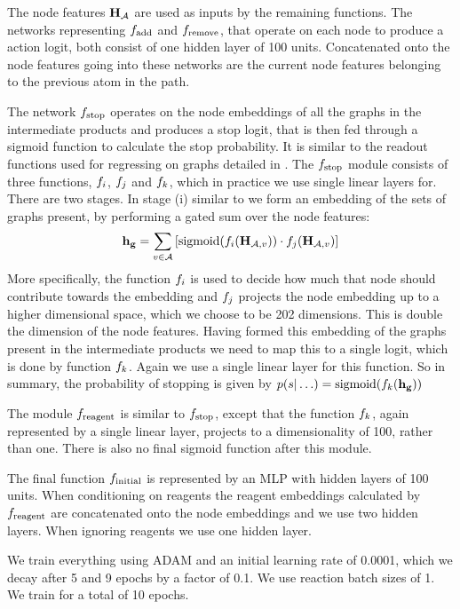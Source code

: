 \documentclass{article}
\begin{document}
The node features ${\mathbf{H}}_{{\mathcal{A}}}$ are used as inputs by the remaining functions. 
The networks representing $f_{\textrm{add}}$ and $f_{\textrm{remove}}$, that operate on each node to produce a action logit, both consist of one hidden layer of 100 units. 
Concatenated onto the node features going into these networks are the current node features belonging to the previous atom in the path.

The network $f_{\textrm{stop}}$ operates on the node embeddings of all the graphs in the intermediate products and produces a stop logit, that is then fed through a sigmoid function to calculate the stop probability.
 It is similar to the readout functions used for regressing on graphs detailed in \citep[Eq. 3]{gilmer2017neural}. 
The $f_{\textrm{stop}}$ module consists of three functions, $f_i$, $f_j$ and $f_k$, which in practice we use single linear layers for. There are two stages. 
In stage (i) similar to \citet[\S B.1]{li2018learning} we form an embedding of the sets of graphs present, by performing a gated sum over the node features:
\begin{align*}
	\mathbf{h_g} = \sum_{v \in {\mathcal{A}}} \left[ \mbox{sigmoid}(f_i({\mathbf{H}}_{{\mathcal{A}},v})) \cdot f_j({\mathbf{H}}_{{\mathcal{A}},v}) \right]
\end{align*}
More specifically, the function $f_i$ is used to decide how much that node should contribute towards the embedding and $f_j$ projects the node embedding up to a higher dimensional space, which we choose to be 202 dimensions. This is double the dimension of the node features.
Having formed this embedding of the graphs present in the intermediate products we need to map this to a single logit, which is done by function $f_k$. 
Again we use a single linear layer for this function.
 So in summary, the probability of stopping is given by $p(s| \ldots) = \mbox{sigmoid} (f_k(\mathbf{h_g}))$

The module $f_{\textrm{reagent}}$ is similar to $f_{\textrm{stop}}$, except that the function $f_k$, again represented by a single linear layer, projects  to a dimensionality of 100, rather than one. There is also no final sigmoid function after this module.

The final function $f_{\textrm{initial}}$ is represented by an MLP with hidden layers of 100 units. When conditioning on reagents the reagent embeddings calculated by $f_{\textrm{reagent}}$ are concatenated onto the node embeddings and we use two hidden layers. When ignoring reagents we use one hidden layer.

We train everything using ADAM \citep{kingma2014adam} and an initial learning rate of 0.0001, which we decay after 5 and 9 epochs by a factor of 0.1. We use reaction batch sizes of 1. We train for a total of 10 epochs.
\end{document}
